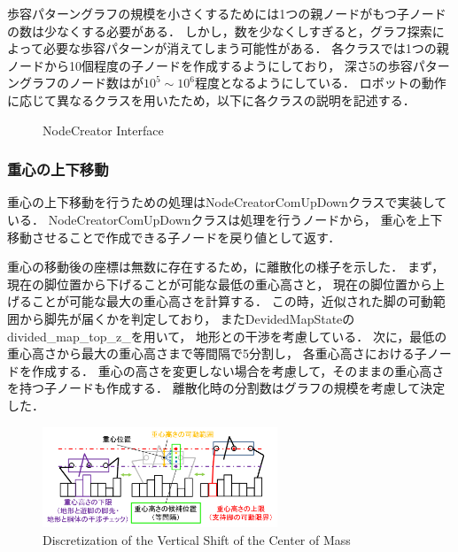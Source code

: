 歩容パターングラフの規模を小さくするためには1つの親ノードがもつ子ノードの数は少なくする必要がある．
しかし，数を少なくしすぎると，グラフ探索によって必要な歩容パターンが消えてしまう可能性がある．
各クラスでは1つの親ノードから10個程度の子ノードを作成するようにしており，
深さ5の歩容パターングラフのノード数はが$10^5 \sim 10^6$程度となるようにしている．
ロボットの動作に応じて異なるクラスを用いたため，以下に各クラスの説明を記述する．
\\

\begin{figure}[h]
  \centering
  \caption{NodeCreator Interface}
  \label{fig:node_creator_class_diagram}  %
\end{figure}

\subsubsection{重心の上下移動}
重心の上下移動を行うための処理はNodeCreatorComUpDownクラスで実装している．
NodeCreatorComUpDownクラスは処理を行うノードから，
重心を上下移動させることで作成できる子ノードを戻り値として返す．

重心の移動後の座標は無数に存在するため，に離散化の様子を示した．
まず，現在の脚位置から下げることが可能な最低の重心高さと，
現在の脚位置から上げることが可能な最大の重心高さを計算する．
この時，近似された脚の可動範囲から脚先が届くかを判定しており，
またDevidedMapStateのdivided\_map\_top\_z\_を用いて，
地形との干渉を考慮している．
次に，最低の重心高さから最大の重心高さまで等間隔で5分割し，
各重心高さにおける子ノードを作成する．
重心の高さを変更しない場合を考慮して，そのままの重心高さを持つ子ノードも作成する．
離散化時の分割数はグラフの規模を考慮して決定した．

\begin{figure}[h]
  \begin{center}
    \includegraphics[width=70mm, clip]{figure/chapter3/com_up_down.png}
    \caption{Discretization of  \newline the Vertical Shift of the Center of Mass}
    \label{fig:com_up_down}  %
  \end{center}
\end{figure}


